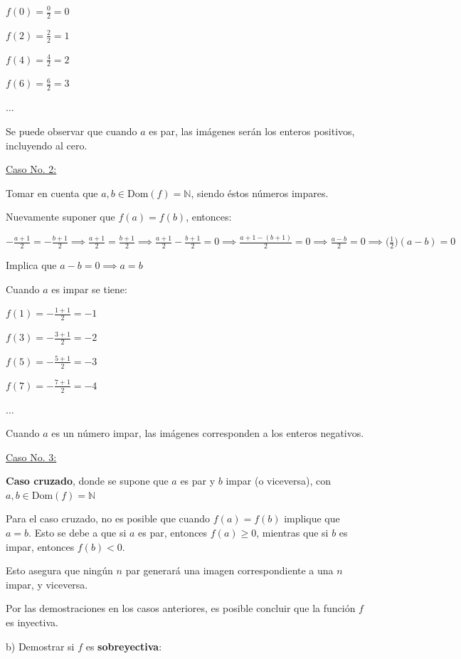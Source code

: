 \documentclass{article}
\begin{document}
$\displaystyle f(0) = \frac{0}{2} = 0$

$\displaystyle f(2) = \frac{2}{2} = 1$

$\displaystyle f(4) = \frac{4}{2} = 2$

$\displaystyle f(6) = \frac{6}{2} = 3$

$\displaystyle \dots$

Se puede observar que cuando $a$ es par, las imágenes serán los enteros positivos, incluyendo al cero.

\underline{Caso No. 2:} 

Tomar en cuenta que $a, b \in \text{Dom}(f) = \mathbb{N}$, siendo éstos números impares.

Nuevamente suponer que $f(a) = f(b)$, entonces:

$\displaystyle -\frac{a + 1}{2} = -\frac{b + 1}{2} \implies \frac{a + 1}{2} = \frac{b + 1}{2} \implies \frac{a + 1}{2} - \frac{b + 1}{2} = 0 \implies \frac{a + 1 -(b + 1)}{2} = 0 \implies \frac{a - b}{2} = 0 \implies \Big(\frac{1}{2}\Big)(a - b) = 0$

Implica que $a - b = 0 \implies a = b$

Cuando $a$ es impar se tiene:

$\displaystyle f(1) = -\frac{1 + 1}{2} = -1$

$\displaystyle f(3) = -\frac{3 + 1}{2} = -2$

$\displaystyle f(5) = -\frac{5 + 1}{2} = -3$

$\displaystyle f(7) = -\frac{7 + 1}{2} = -4$

$\dots$

Cuando $a$ es un número impar, las imágenes corresponden a los enteros negativos.

\underline{Caso No. 3:} 

\textbf{Caso cruzado}, donde se supone que $a$ es par y $b$ impar (o viceversa), con $a, b \in \text{Dom}(f) = \mathbb{N}$

Para el caso cruzado, no es posible que cuando $f(a) = f(b)$ implique que $a = b$. Esto se debe a que si $a$ es par, entonces $f(a) \ge 0$, mientras que si $b$ es impar, entonces $f(b) < 0$.

Esto asegura que ningún $n$ par generará una imagen correspondiente a una $n$ impar, y viceversa.

Por las demostraciones en los casos anteriores, es posible concluir que la función $f$ es inyectiva.

b) Demostrar si $f$ es \textbf{sobreyectiva}:
\end{document}
